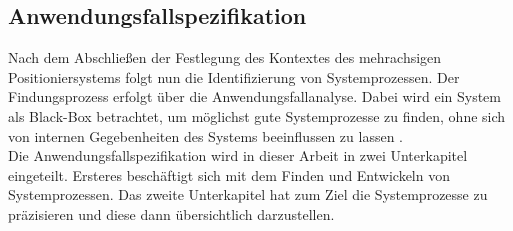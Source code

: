 \documentclass[../../../Bachelorarbeit.tex]{subfiles}
\begin{document}
\subsection{Anwendungsfallspezifikation} \label{AnwfallSpez}
Nach dem Abschließen der Festlegung des Kontextes des mehrachsigen Positioniersystems folgt nun die Identifizierung von Systemprozessen. Der Findungsprozess erfolgt über die Anwendungsfallanalyse. Dabei wird ein System als Black-Box betrachtet, um möglichst gute Systemprozesse zu finden, ohne sich von internen Gegebenheiten des Systems beeinflussen zu lassen \cite[401]{Goll2011}.\\
Die Anwendungsfallspezifikation wird in dieser Arbeit in zwei Unterkapitel eingeteilt. Ersteres beschäftigt sich mit dem Finden und Entwickeln von Systemprozessen. Das zweite Unterkapitel hat zum Ziel die Systemprozesse zu präzisieren und diese dann übersichtlich darzustellen.\\
\end{document}
